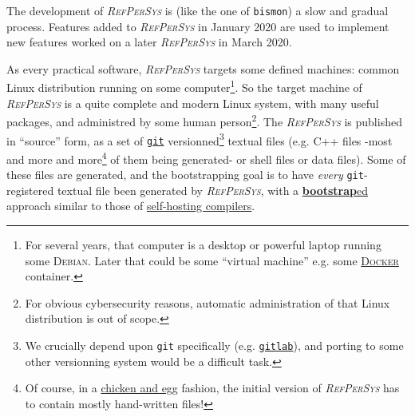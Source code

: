 \documentclass[11pt,a4paper,svgnames]{article}
\newcommand{\RefPerSys}{{\textit{\textsc{RefPerSys}}}}
\begin{document}
The development of {\RefPerSys} is (like the one of \texttt{bismon}) a
slow and gradual process. Features added to {\RefPerSys} in January
2020 are used to implement new features worked on a later {\RefPerSys}
in March 2020.

As every practical software, {\RefPerSys} targets some defined
machines: common Linux distribution running on some
computer\footnote{For several years, that computer is a desktop or
powerful laptop running some \textsc{Debian}. Later that could be some
``virtual machine'' e.g. some
\href{https://www.docker.com/}{\textsc{Docker}} container.}. So the
target machine of {\RefPerSys} is a quite complete and modern Linux
system, with many useful packages, and administred by some human
person\footnote{For obvious cybersecurity reasons, automatic
administration of that Linux distribution is out of scope.}. The
{\RefPerSys} is published in ``source'' form, as a set of
\href{http://git-scm.com/}{\texttt{git}} versionned\footnote{We
crucially depend upon \texttt{git} specifically
(e.g. \href{http://gitlab.org/}{\texttt{gitlab}}), and porting to some
other versionning system would be a difficult task.} textual files
(e.g. C++ files -most and more and more\footnote{Of course, in a
\href{https://en.wikipedia.org/wiki/Chicken_or_the_egg}{chicken and
  egg} fashion, the initial version of {\RefPerSys} has to contain
mostly hand-written files!} of them being generated- or shell files or
data files). Some of these files are generated, and the bootstrapping
goal is to have \emph{every} \texttt{git}-registered textual file been
generated by {\RefPerSys}, with a
\href{https://en.wikipedia.org/wiki/Bootstrapping\_(compilers)}{\textbf{bootstrap}ed}
approach similar to those of
\href{https://en.wikipedia.org/wiki/Self-hosting_(compilers)}{self-hosting
  compilers}.
\medskip


\clearpage


\printbibliography
\end{document}
